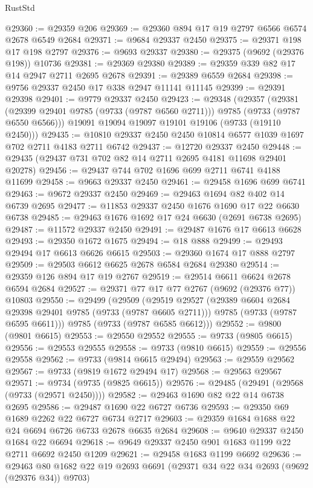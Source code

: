 \begin{lexlean}{RustStd}
\begin{coremodule}
{\begin{coremodule}
{{{{{{{{{{{{{{{{{{{{{{{{{{{{{{{{{{{{{{{{{{{{{{{{{{{{{{{@29360 := @29359 @206
@29369 := @29360 @894 @17 @19 @2797 @6566 @6574 @2678 @6549 @2684
@29371 := @9684 @29337 @2450
@29375 := @29371 @198 @17 @198 @2797
@29376 := @9693 @29337
@29380 := @29375 (@9692 (@29376 @198)) @10736
@29381 := @29369 @29380
@29389 := @29359 @339 @82 @17 @14 @2947 @2711 @2695 @2678
@29391 := @29389 @6559 @2684
@29398 := @9756 @29337 @2450 @17 @338 @2947 @11141 @11145
@29399 := @29391 @29398
@29401 := @9779 @29337 @2450
@29423 := @29348
    (@29357
      (@29381 (@29399 @29401 @9785 (@9733 (@9787 @6560 @2711))) @9785 (@9733 (@9787 @6550 @6566)))
      @19091
      @19094
      @19097
      @19101
      @19106
      (@9733 (@19110 @2450)))
@29435 := @10810 @29337 @2450 @2450 @10814 @6577 @1039 @1697 @702 @2711 @4183 @2711 @6742
@29437 := @12720 @29337 @2450
@29448 := @29435 (@29437 @731 @702 @82 @14 @2711 @2695 @4181 @11698 @29401 @20278)
@29456 := @29437 @744 @702 @1696 @699 @2711 @6741 @4188 @11699
@29458 := @9663 @29337 @2450
@29461 := @29458 @1696 @699 @6741
@29463 := @9672 @29337 @2450
@29469 := @29463 @1694 @82 @402 @14 @6739 @2695
@29477 := @11853 @29337 @2450 @1676 @1690 @17 @22 @6630 @6738
@29485 := @29463 @1676 @1692 @17 @24 @6630 (@2691 @6738 @2695)
@29487 := @11572 @29337 @2450
@29491 := @29487 @1676 @17 @6613 @6628
@29493 := @29350 @1672 @1675
@29494 := @18 @888
@29499 := @29493 @29494 @17 @6613 @6626 @6615
@29503 := @29360 @1674 @17 @888 @2797
@29509 := @29503 @6612 @6625 @2678 @6584 @2684 @29380
@29514 := @29359 @126 @894 @17 @19 @2767
@29519 := @29514 @6611 @6624 @2678 @6594 @2684
@29527 := @29371 @77 @17 @77 @2767 (@9692 (@29376 @77)) @10803
@29550 := @29499
    (@29509
      (@29519
        @29527
        (@29389 @6604 @2684 @29398 @29401 @9785 (@9733 (@9787 @6605 @2711)))
        @9785
        (@9733 (@9787 @6595 @6611)))
      @9785
      (@9733 (@9787 @6585 @6612)))
@29552 := @9800 (@9801 @6615)
@29553 := @29550 @29552
@29555 := @9733 (@9805 @6615)
@29556 := @29553 @29555
@29558 := @9733 (@9810 @6615)
@29559 := @29556 @29558
@29562 := @9733 (@9814 @6615 @29494)
@29563 := @29559 @29562
@29567 := @9733 (@9819 @1672 @29494 @17)
@29568 := @29563 @29567
@29571 := @9734 (@9735 (@9825 @6615))
@29576 := @29485 (@29491 (@29568 (@9733 (@29571 @2450))))
@29582 := @29463 @1690 @82 @22 @14 @6738 @2695
@29586 := @29487 @1690 @22 @6727 @6736
@29593 := @29350 @69 @1689 @2262 @22 @6727 @6734 @2717
@29603 := @29359 @1684 @1688 @22 @24 @6694 @6726 @6733 @2678 @6635 @2684
@29608 := @9640 @29337 @2450 @1684 @22 @6694
@29618 := @9649 @29337 @2450 @901 @1683 @1199 @22 @2711 @6692 @2450 @1209
@29621 := @29458 @1683 @1199 @6692
@29636 := @29463 @80 @1682 @22 @19 @2693 @6691 (@29371 @34 @22 @34 @2693 (@9692 (@29376 @34)) @9703)
}}}}}}}}}}}}}}}}}}}}}}}}}}}}}}}}}}}}}}}}}}}}}}}}}}}}}}}
\end{coremodule}}
\end{coremodule}
\end{lexlean}
